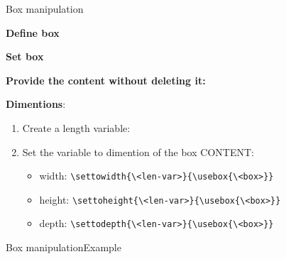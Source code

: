 \begin{frame}[fragile]{Box manipulation\lW\magicPage}\relax

\textbf{Define box} 

\textbf{Set box} \ccol{\savebox}

\textbf{Provide the content without deleting it:} \ccol{\usebox}

\textbf{Dimentions}: 
\begin{enumerate}
    \item Create a length variable: \ccol\newlength
    \item Set the variable to dimention of the box CONTENT:
    \begin{itemize}
        \item width: \verb|\settowidth{\<len-var>}{\usebox{\<box>}}|
        \item height: \verb|\settoheight{\<len-var>}{\usebox{\<box>}}|
        \item depth: \verb|\settodepth{\<len-var>}{\usebox{\<box>}}|
    \end{itemize}
     
\end{enumerate}

\end{frame}

\begin{frame}{Box manipulation\lW\magicPage}{Example}\relax

 
\end{frame}